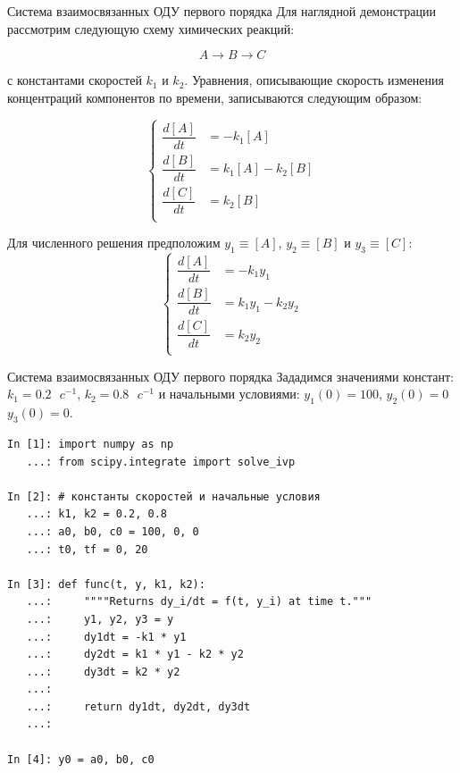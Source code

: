 \documentclass[aspectratio=169, mathserif]{beamer}	%
\begin{document}
\begin{frame}[fragile]{Система взаимосвязанных ОДУ первого порядка}
\scriptsize
Для наглядной демонстрации рассмотрим следующую схему химических реакций:

$$A \rightarrow B \rightarrow C$$

\noindent с константами скоростей $k_1$ и $k_2$. Уравнения, описывающие скорость изменения концентраций компонентов по времени, записываются следующим образом:

\begin{equation*}
	\left\{
	\begin{aligned}
		\dfrac{d\left[A\right]}{dt} &= -k_1\left[A\right] \\
		\dfrac{d\left[B\right]}{dt} &=  k_1\left[A\right] - k_2\left[B\right] \\
		\dfrac{d\left[C\right]}{dt} &=  k_2\left[B\right] \\
	\end{aligned}
	\right.
\end{equation*}


Для численного решения предположим $y_1 \equiv \left[A\right]$,  $y_2 \equiv \left[B\right]$ и $y_3 \equiv \left[C\right]$:
\begin{equation*}
	\left\{
	\begin{aligned}
		\dfrac{d\left[A\right]}{dt} &= -k_1y_1 \\
		\dfrac{d\left[B\right]}{dt} &=  k_1y_1 - k_2y_2 \\
		\dfrac{d\left[C\right]}{dt} &=  k_2y_2 \\
	\end{aligned}
	\right.
\end{equation*}
\vfil
\end{frame}

\begin{frame}[fragile]{Система взаимосвязанных ОДУ первого порядка}
\scriptsize
Зададимся значениями констант: $k_1 = 0.2 \text{ } c^{-1}$, $k_2 = 0.8 \text{ } c^{-1}$ и начальными условиями: $y_1(0) = 100$, $y_2(0) = 0$ $y_3(0) = 0$. 

\begin{lstlisting}[language=iPython, numbers=none, frame=none]
In [1]: import numpy as np
   ...: from scipy.integrate import solve_ivp

In [2]: # константы скоростей и начальные условия 
   ...: k1, k2 = 0.2, 0.8
   ...: a0, b0, c0 = 100, 0, 0
   ...: t0, tf = 0, 20

In [3]: def func(t, y, k1, k2):
   ...:     """"Returns dy_i/dt = f(t, y_i) at time t."""
   ...:     y1, y2, y3 = y
   ...:     dy1dt = -k1 * y1
   ...:     dy2dt = k1 * y1 - k2 * y2
   ...:     dy3dt = k2 * y2
   ...:
   ...:     return dy1dt, dy2dt, dy3dt
   ...:

In [4]: y0 = a0, b0, c0
\end{lstlisting}
\vfil
\end{frame}
\end{document}
